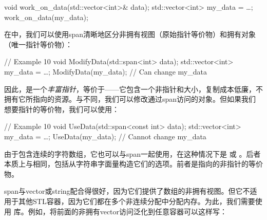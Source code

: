 \begin{code}
void work_on_data(std::vector<int>& data);
std::vector<int> my_data = …;
work_on_data(my_data);
\end{code}

在\cpp[20] 中，我们可以使用span清晰地区分非拥有视图（原始指针等价物）和拥有对象（唯一指针等价物）：

\begin{code}
// Example 10
void ModifyData(std::span<int> data);
std::vector<int> my_data = …;
ModifyData(my_data); // Can change my_data
\end{code}

因此，是一个\emph{丰富指针}，等价于——它包含一个非指针和大小，复制成本低廉，不拥有它所指向的资源。与不同，我们可以修改通过span访问的对象。但如果我们想要指针的等价物，我们可以使用：

\begin{code}
// Example 10
void UseData(std::span<const int> data);
std::vector<int> my_data = …;
UseData(my_data); // Cannot change my_data
\end{code}

由于包含连续的字符数组，它也可以与span一起使用，在这种情况下是 或 。后者本质上与相同，包括从字符串字面量构造它们的选项。前者是指向的非指针的等价物。

span与vector或string配合得很好，因为它们提供了数组的非拥有视图。但它不适用于其他STL容器，因为它们都在多个非连续分配中分配内存。为此，我们需要使用\cpp[20]   库。例如，将前面的非拥有vector访问泛化到任意容器可以这样写：

